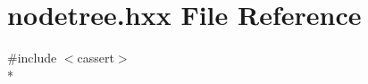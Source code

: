 \section{nodetree.\+hxx File Reference}
\label{nodetree_8hxx}
{\ttfamily \#include $<$cassert$>$}\\*
